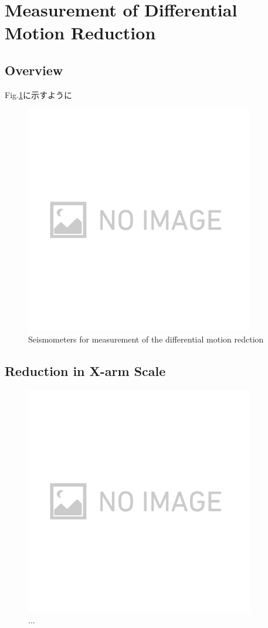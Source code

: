 \section{Measurement of Differential Motion Reduction}
\subsection{Overview}
Fig.\ref{img:img318}に示すように

\begin{figure}[H]
  \begin{center}   
    \includegraphics[width=10.0cm]{./img_chap3/img318.png}
    \caption{Seismometers for measurement of the differential motion redction}\label{img:img318}
  \end{center}
\end{figure}


\subsection{Reduction in X-arm Scale}


\begin{figure}[H]
  \begin{center}   
    \includegraphics[width=10.0cm]{./img_chap3/img319.png}
    \caption{...}\label{img:img319}
  \end{center}
\end{figure}

